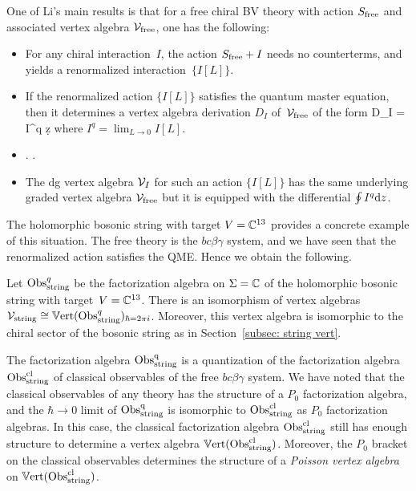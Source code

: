One of Li's main results is that for a free chiral BV theory with action $S_{\rm free}$ and associated vertex algebra $\mathcal{V}_{\rm free}$, one has the following:
\begin{itemize}
\item For any chiral interaction~$I$, the action $S_{\rm free} + I$ needs no counterterms, 
and yields a renormalized interaction~$\{I [L]\}$.
\item If the renormalized action $\{I[L]\}$ satisfies the quantum master equation,
then it determines a vertex algebra derivation $D_I$ of~$\mathcal{V}_{\rm free}$ of the form
\ben
D_I = \oint I^q \d z
\een
where $I^q = \lim_{L \to 0} I[L]$.
\item {}. .
\item The dg vertex algebra $\mathcal{V}_I$ for such an action $\{I[L]\}$ has the same underlying graded vertex algebra $\mathcal{V}_{\rm free}$ but it is equipped with the differential $\oint I^q {\rm d} z$. 
\end{itemize}

The holomorphic bosonic string with target $V=\mathbb C^{13}$ provides a concrete example of this situation.
The free theory is the $bc\beta\gamma$ system, 
and we have seen that the renormalized action satisfies the QME.
Hence we obtain the following.

\begin{prop} 
Let ${\rm Obs}^q_{\rm string}$ be the factorization algebra on $\Sigma = \mathbb C$ of the holomorphic bosonic string with target~$V = \mathbb C^{13}$. 
There is an isomorphism of vertex algebras $\mathcal{V}_{\rm string} \cong \mathbb{V}{\rm ert}({\rm Obs}^q_{\rm string})_{\hbar = 2 \pi i}$.
Moreover, this vertex algebra is isomorphic to the chiral sector of the bosonic string as in Section~\ref{subsec: string vert}.
\end{prop}

The factorization algebra ${\rm Obs}^{\rm q}_{\rm string}$ is a quantization of the factorization algebra ${\rm Obs}^{{\rm cl}}_{\rm string}$ of classical observables of the free $bc\beta\gamma$ system.
We have noted that the classical observables of any theory has the structure of a $P_0$ factorization algebra, and the $\hbar \to 0$ limit of ${\rm Obs}^{\rm q}_{\rm string}$ is isomorphic to ${\rm Obs}^{{\rm cl}}_{\rm string}$ as $P_0$ factorization algebras. 
In this case, the classical factorization algebra ${\rm Obs}^{{\rm cl}}_{\rm string}$ still has enough structure to determine a vertex algebra $\mathbb{V}{\rm ert}({\rm Obs}^{\rm cl}_{\rm string})$.
Moreover, the $P_0$ bracket on the classical observables determines the structure of a {\em Poisson vertex algebra} on $\mathbb{V}{\rm ert}({\rm Obs}^{{\rm cl}}_{\rm string})$. 

